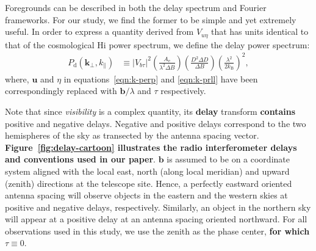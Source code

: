 \documentclass[preprint2,iop,numberedappendix]{emulateapj}
\begin{document}
Foregrounds can be described in both the delay spectrum and Fourier frameworks. For our study, we find the former to be simple and yet extremely useful. In order to express a quantity derived from $V_{u\eta}$ that has units identical to that of the cosmological H{\sc i} power spectrum, we define the delay power spectrum:
\begin{align}\label{eqn:fake-power-spectrum}
  P_\textrm{d}(\boldsymbol{k}_\perp,k_\parallel) &\equiv |V_{b\tau}|^2\left(\frac{A_\textrm{e}}{\lambda^2\Delta B}\right)\left(\frac{D^2\Delta D}{\Delta B}\right)\left(\frac{\lambda^2}{2k_\textrm{B}}\right)^2,
\end{align}
where, $\boldsymbol{u}$ and $\eta$ in equations~\ref{eqn:k-perp} and \ref{eqn:k-prll} have been correspondingly replaced with $\boldsymbol{b}/\lambda$ and $\tau$ respectively. 

Note that since {\it visibility} is a complex quantity, its {\bf delay} transform {\bf contains} positive and negative delays. Negative and positive delays correspond to the two hemispheres of the sky as transected by the antenna spacing vector. {\bf Figure~\ref{fig:delay-cartoon} illustrates the radio interferometer delays and conventions used in our paper}. $\boldsymbol{b}$ is assumed to be on a coordinate system aligned with the local east, north (along local meridian) and upward (zenith) directions at the telescope site. Hence, a perfectly eastward oriented antenna spacing will observe objects in the eastern and the western skies at positive and negative delays, respectively. Similarly, an object in the northern sky will appear at a positive delay at an antenna spacing oriented northward. For all observations used in this study, we use the zenith as the phase center, {\bf for which $\tau\equiv 0$}. 
\end{document}
